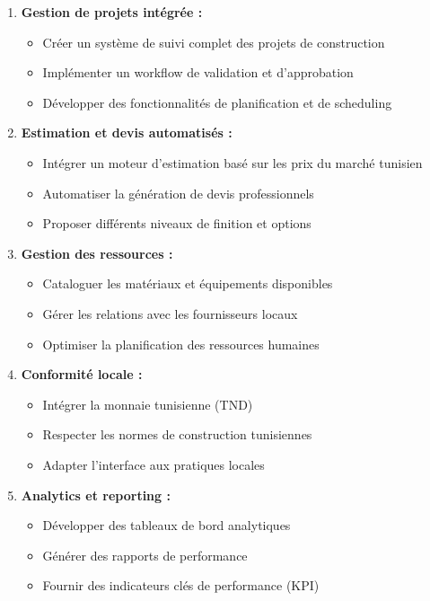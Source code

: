 \begin{enumerate}
    \item \textbf{Gestion de projets intégrée :}
    \begin{itemize}
        \item Créer un système de suivi complet des projets de construction
        \item Implémenter un workflow de validation et d'approbation
        \item Développer des fonctionnalités de planification et de scheduling
    \end{itemize}
    
    \item \textbf{Estimation et devis automatisés :}
    \begin{itemize}
        \item Intégrer un moteur d'estimation basé sur les prix du marché tunisien
        \item Automatiser la génération de devis professionnels
        \item Proposer différents niveaux de finition et options
    \end{itemize}
    
    \item \textbf{Gestion des ressources :}
    \begin{itemize}
        \item Cataloguer les matériaux et équipements disponibles
        \item Gérer les relations avec les fournisseurs locaux
        \item Optimiser la planification des ressources humaines
    \end{itemize}
    
    \item \textbf{Conformité locale :}
    \begin{itemize}
        \item Intégrer la monnaie tunisienne (TND)
        \item Respecter les normes de construction tunisiennes
        \item Adapter l'interface aux pratiques locales
    \end{itemize}
    
    \item \textbf{Analytics et reporting :}
    \begin{itemize}
        \item Développer des tableaux de bord analytiques
        \item Générer des rapports de performance
        \item Fournir des indicateurs clés de performance (KPI)
    \end{itemize}
\end{enumerate}

